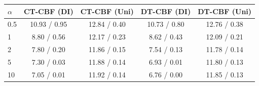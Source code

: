 \begin{tabular}{lcccc}
\hline
$\alpha$ & CT-CBF (DI) & CT-CBF (Uni) & DT-CBF (DI) & DT-CBF (Uni) \\
\hline
0.5 & 10.93 / 0.95 & 12.84 / 0.40 & 10.73 / 0.80 & 12.76 / 0.38 \\
1 & 8.80 / 0.56 & 12.17 / 0.23 & 8.62 / 0.43 & 12.09 / 0.21 \\
2 & 7.80 / 0.20 & 11.86 / 0.15 & 7.54 / 0.13 & 11.78 / 0.14 \\
5 & 7.30 / 0.03 & 11.88 / 0.14 & 6.93 / 0.01 & 11.80 / 0.13 \\
10 & 7.05 / 0.01 & 11.92 / 0.14 & 6.76 / 0.00 & 11.85 / 0.13 \\
\hline
\end{tabular}
